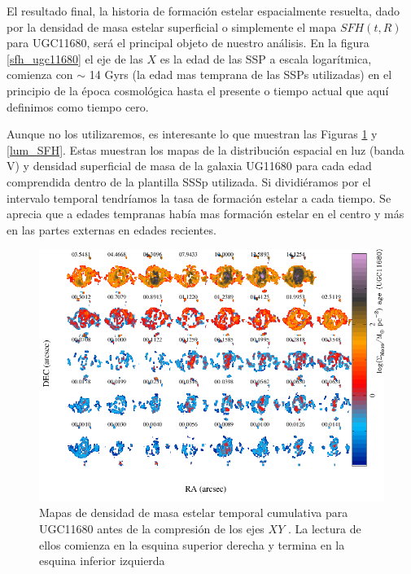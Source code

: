 \noindent El resultado final, la historia de formación estelar espacialmente resuelta, dado por la densidad de masa estelar superficial o simplemente el mapa $SFH(t,R)$ para UGC11680, será el principal objeto de nuestro análisis. En la figura \ref{sfh_ugc11680}
el eje de las $X$ es la edad de las SSP a escala logarítmica, comienza con $\sim$ 14 Gyrs (la edad mas temprana de las SSPs utilizadas)
en el principio de la época cosmológica hasta el presente o tiempo actual que aquí definimos como tiempo cero.



\bigskip

\noindent Aunque no los utilizaremos, es interesante lo que muestran  las Figuras \ref{mass_SFH} y \ref{lum_SFH}. Estas muestran los mapas de la distribución espacial en luz (banda V) y densidad superficial de masa de la galaxia UG11680  para cada edad comprendida dentro de la plantilla SSSp utilizada. Si dividiéramos por el intervalo temporal tendríamos la tasa de formación estelar a cada tiempo. Se aprecia que a edades tempranas había mas formación estelar en el centro y más en las partes externas en edades recientes.



\begin{figure}
  \centering
    \includegraphics[scale=0.5]{Converted_file_73ee484d.png}
  \caption[Mapas de Densidad de masa superficial]{Mapas de densidad de masa estelar temporal cumulativa para UGC11680 antes de la compresión de los ejes $XY$ . La lectura de ellos comienza en la esquina superior derecha y termina en la esquina inferior izquierda}
  \label{mass_SFH}
\end{figure}

